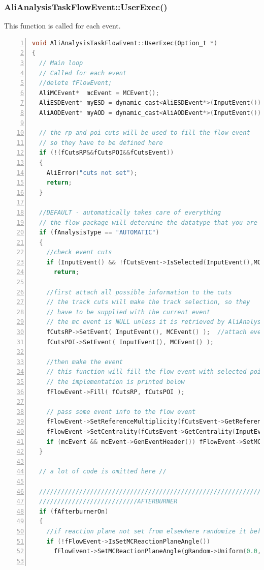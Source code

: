 \documentclass[a4paper]{book}
\numberwithin{equation}{subsection}
\begin{document}
\subsubsection{AliAnalysisTaskFlowEvent::UserExec()}
This function is called for each event. 
\begin{lstlisting}[language=C, numbers=left]
void AliAnalysisTaskFlowEvent::UserExec(Option_t *)
{
  // Main loop
  // Called for each event
  //delete fFlowEvent;
  AliMCEvent*  mcEvent = MCEvent();                              // from TaskSE
  AliESDEvent* myESD = dynamic_cast<AliESDEvent*>(InputEvent()); // from TaskSE
  AliAODEvent* myAOD = dynamic_cast<AliAODEvent*>(InputEvent()); // from TaskSE

  // the rp and poi cuts will be used to fill the flow event
  // so they have to be defined here
  if (!(fCutsRP&&fCutsPOI&&fCutsEvent))
  {
    AliError("cuts not set");
    return;
  }

  //DEFAULT - automatically takes care of everything
  // the flow package will determine the datatype that you are using
  if (fAnalysisType == "AUTOMATIC")
  {
    //check event cuts
    if (InputEvent() && !fCutsEvent->IsSelected(InputEvent(),MCEvent())) 
      return;

    //first attach all possible information to the cuts
    // the track cuts will make the track selection, so they
    // have to be supplied with the current event
    // the mc event is NULL unless it is retrieved by AliAnalysisTaskSE   
    fCutsRP->SetEvent( InputEvent(), MCEvent() );  //attach event
    fCutsPOI->SetEvent( InputEvent(), MCEvent() );

    //then make the event
    // this function will fill the flow event with selected poi's and rp's
    // the implementation is printed below
    fFlowEvent->Fill( fCutsRP, fCutsPOI );

    // pass some event info to the flow event
    fFlowEvent->SetReferenceMultiplicity(fCutsEvent->GetReferenceMultiplicity(InputEvent(),mcEvent));
    fFlowEvent->SetCentrality(fCutsEvent->GetCentrality(InputEvent(),mcEvent));
    if (mcEvent && mcEvent->GenEventHeader()) fFlowEvent->SetMCReactionPlaneAngle(mcEvent);
  }

  // a lot of code is omitted here //

  //////////////////////////////////////////////////////////////////////////////
  ///////////////////////////AFTERBURNER
  if (fAfterburnerOn)
  {
    //if reaction plane not set from elsewhere randomize it before adding flow
    if (!fFlowEvent->IsSetMCReactionPlaneAngle())
      fFlowEvent->SetMCReactionPlaneAngle(gRandom->Uniform(0.0,TMath::TwoPi()));


\end{lstlisting}
\end{document}
